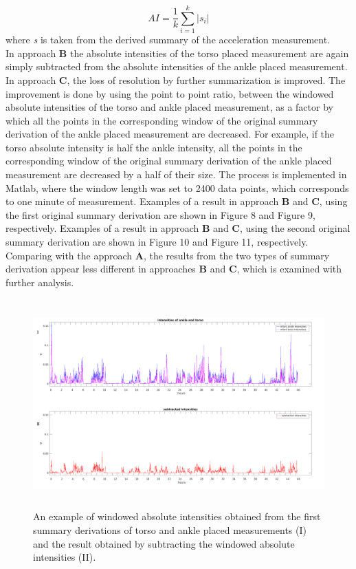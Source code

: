 \documentclass{article}
\begin{document}
{\begin{displaymath}AI=\frac{1}{k}\sum_{i=1}^{k}|s_i|\end{displaymath} where \textit{s} is taken from the derived summary of the acceleration measurement.\\
In approach \textbf{B} the absolute intensities of the torso placed measurement are again simply subtracted from the absolute intensities of the ankle placed measurement. In approach \textbf{C}, the loss of resolution by further summarization is improved. The improvement is done by using the point to point ratio, between the windowed absolute intensities of the torso and ankle placed measurement, as a factor by which all the points in the corresponding window of the original summary derivation of the ankle placed measurement are decreased. For example, if the torso absolute intensity is half the ankle intensity, all the points in the corresponding window of the original summary derivation of the ankle placed measurement are decreased by a half of their size. The process is implemented in Matlab, where the window length was set to 2400 data points, which corresponds to one minute of measurement. Examples of a result in approach \textbf{B} and \textbf{C}, using the first original summary derivation are shown in Figure 8 and Figure 9, respectively. Examples of a result in approach \textbf{B} and \textbf{C}, using the second original summary derivation are shown in Figure 10 and Figure 11, respectively. Comparing with the approach \textbf{A}, the results from the two types of summary derivation appear less different in approaches \textbf{B} and \textbf{C}, which is examined with further analysis. 
\newpage
\begin{figure}[h!]
\includegraphics[width=15cm, height=8cm]{subtractedIntensities.png}
\caption{An example of windowed absolute intensities obtained from the first summary derivations of torso and ankle placed measurements (I) and the result obtained by subtracting the windowed absolute intensities (II).}

\end{figure}}
\end{document}
